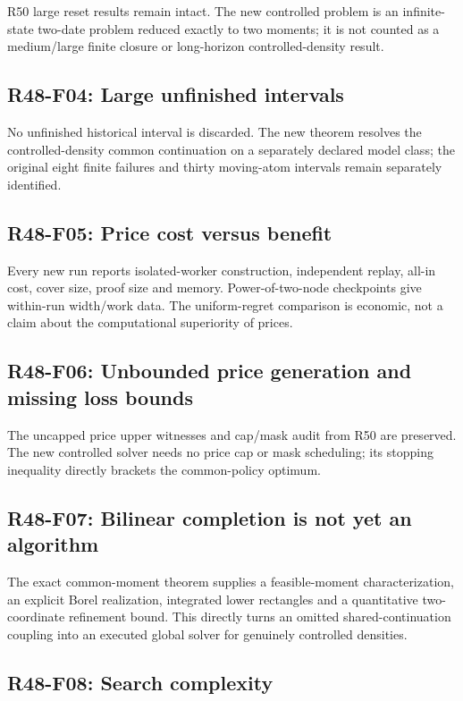 R50 large reset results remain intact. The new controlled problem is an infinite-state two-date problem reduced exactly to two moments; it is not counted as a medium/large finite closure or long-horizon controlled-density result.

\subsection{R48-F04: Large unfinished intervals}

No unfinished historical interval is discarded. The new theorem resolves the controlled-density common continuation on a separately declared model class; the original eight finite failures and thirty moving-atom intervals remain separately identified.

\subsection{R48-F05: Price cost versus benefit}

Every new run reports isolated-worker construction, independent replay, all-in cost, cover size, proof size and memory. Power-of-two-node checkpoints give within-run width/work data. The uniform-regret comparison is economic, not a claim about the computational superiority of prices.

\subsection{R48-F06: Unbounded price generation and missing loss bounds}

The uncapped price upper witnesses and cap/mask audit from R50 are preserved. The new controlled solver needs no price cap or mask scheduling; its stopping inequality directly brackets the common-policy optimum.

\subsection{R48-F07: Bilinear completion is not yet an algorithm}

The exact common-moment theorem supplies a feasible-moment characterization, an explicit Borel realization, integrated lower rectangles and a quantitative two-coordinate refinement bound. This directly turns an omitted shared-continuation coupling into an executed global solver for genuinely controlled densities.

\subsection{R48-F08: Search complexity}

